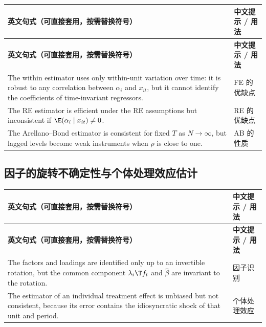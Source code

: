 {\renewcommand{\arraystretch}{1.15}\begin{longtable}{@{}>{\raggedright\arraybackslash}p{11.4cm}>{\raggedright\arraybackslash\small}p{4.3cm}@{}}
\toprule
\textbf{英文句式（可直接套用，按需替换符号）} & \textbf{中文提示 / 用法}\\
\midrule
\endfirsthead
\toprule
\textbf{英文句式（可直接套用，按需替换符号）} & \textbf{中文提示 / 用法}\\
\midrule
\endhead
\bottomrule
\endlastfoot
The within estimator uses only within-unit variation over time: it is robust to any correlation between $\alpha_i$ and $x_{it}$, but it cannot identify the coefficients of time-invariant regressors. & FE 的优缺点\\
\addlinespace[2pt]
The RE estimator is efficient under the RE assumptions but inconsistent if $\E(\alpha_i\mid x_{it})\neq 0$. & RE 的优缺点\\
\addlinespace[2pt]
The Arellano--Bond estimator is consistent for fixed $T$ as $N\to\infty$, but lagged levels become weak instruments when $\rho$ is close to one. & AB 的性质\\
\end{longtable}}


\subsection{因子的旋转不确定性与个体处理效应估计}

{\renewcommand{\arraystretch}{1.15}\begin{longtable}{@{}>{\raggedright\arraybackslash}p{11.4cm}>{\raggedright\arraybackslash\small}p{4.3cm}@{}}
\toprule
\textbf{英文句式（可直接套用，按需替换符号）} & \textbf{中文提示 / 用法}\\
\midrule
\endfirsthead
\toprule
\textbf{英文句式（可直接套用，按需替换符号）} & \textbf{中文提示 / 用法}\\
\midrule
\endhead
\bottomrule
\endlastfoot
The factors and loadings are identified only up to an invertible rotation, but the common component $\lambda_i\T f_t$ and $\hat\beta$ are invariant to the rotation. & 因子识别\\
\addlinespace[2pt]
The estimator of an individual treatment effect is unbiased but not consistent, because its error contains the idiosyncratic shock of that unit and period. & 个体处理效应\\
\end{longtable}}


